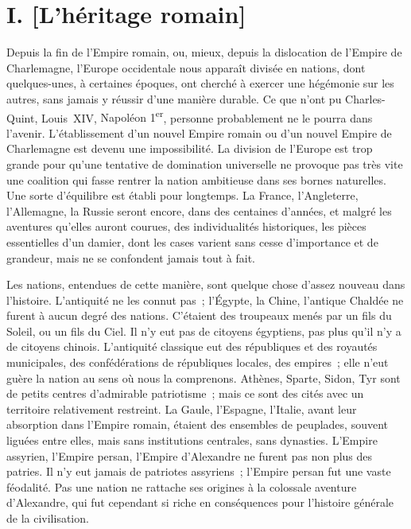 \documentclass[french,twoside]{book} %
\newcommand\orgName[1]{#1}
\newcommand\persName[1]{#1}
\newcommand\placeName[1]{#1}
\newcommand\chapteropen{} %
\newcommand\chaptercont{} %
\begin{document}
\chapteropen

\chapter[{I. [L’héritage romain]}]{I. [L’héritage romain]}
\renewcommand{\leftmark}{I. [L’héritage romain]}


\chaptercont
\noindent Depuis la fin de l’{\orgName Empire romain}, ou, mieux, depuis la dislocation de l’{\orgName Empire de Charlemagne}, l’{\placeName Europe occidentale} nous apparaît divisée en nations, dont quelques-unes, à certaines époques, ont cherché à exercer une hégémonie sur les autres, sans jamais y réussir d’une manière durable. Ce que n’ont pu {\persName Charles-Quint}, {\persName Louis XIV}, {\persName Napoléon 1\textsuperscript{er}}, personne probablement ne le pourra dans l’avenir. L’établissement d’un nouvel {\orgName Empire romain} ou d’un nouvel {\orgName Empire de Charlemagne} est devenu une impossibilité. La division de l’{\orgName Europe} est trop grande pour qu’une tentative de domination universelle ne provoque pas très vite une coalition qui fasse rentrer la nation ambitieuse dans ses bornes naturelles. Une sorte d’équilibre est établi pour longtemps. La {\orgName France}, l’{\orgName Angleterre}, l’{\orgName Allemagne}, la {\orgName Russie} seront encore, dans des centaines d’années, et malgré les aventures qu’elles auront courues, des individualités historiques, les pièces essentielles d’un damier, dont les cases varient sans cesse d’importance et de grandeur, mais ne se confondent jamais tout à fait.\par
Les nations, entendues de cette manière, sont quelque chose d’assez nouveau dans l’histoire. L’antiquité ne les connut pas ; l’{\orgName Égypte}, la {\orgName Chine}, l’antique {\orgName Chaldée} ne furent à aucun degré des nations. C’étaient des troupeaux menés par un fils du Soleil, ou un fils du Ciel. Il n’y eut pas de citoyens égyptiens, pas plus qu’il n’y a de citoyens chinois. L’antiquité classique eut des républiques et des royautés municipales, des confédérations de républiques locales, des empires ; elle n’eut guère la nation au sens où nous la comprenons. {\orgName Athènes}, {\orgName Sparte}, {\orgName Sidon}, {\orgName Tyr} sont de petits centres d’admirable patriotisme ; mais ce sont des cités avec un territoire relativement restreint. La {\orgName Gaule}, l’{\orgName Espagne}, l’{\orgName Italie}, avant leur absorption dans l’{\orgName Empire romain}, étaient des ensembles de peuplades, souvent liguées entre elles, mais sans institutions centrales, sans dynasties. L’{\orgName Empire assyrien}, l’{\orgName Empire persan}, l’{\orgName Empire d’Alexandre} ne furent pas non plus des patries. Il n’y eut jamais de patriotes assyriens ; l’{\orgName Empire persan} fut une vaste féodalité. Pas une nation ne rattache ses origines à la colossale aventure d’{\persName Alexandre}, qui fut cependant si riche en conséquences pour l’histoire générale de la civilisation.\par
\end{document}

